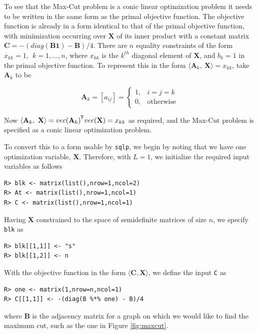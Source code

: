 \documentclass{article}
\newcommand{\ve}[1]{\mathbf{#1}}           %
\newcommand{\m}[1]{\mathbf{#1}}               %
\newcommand{\tr}[1]{{#1}^{\mkern-1.5mu\mathsf{T}}}              %
\begin{document}
To see that the Max-Cut problem is a conic linear optimization problem it needs to be written in the same form as the primal objective function. The objective function is already in a form identical to that of the primal objective function, with minimization occurring over $\m{X}$ of its inner product with a constant matrix $\m{C} = -(diag(\m{B}\ve{1}) - \m{B})/4$. There are $n$ equality constraints of the form $x_{kk} = 1,~~k=1,...,n$, where $x_{kk}$ is the $k^{th}$ diagonal element of $\m{X}$, and $b_{k} = 1$ in the primal objective function. To represent this in the form $\langle \m{A}_{k},~\m{X} \rangle = x_{kk}$,  take $\m{A}_{k}$ to be

\[
\m{A}_{k} = [a_{ij}] = 
\begin{cases}
1, & i = j = k \\
0, & \text{otherwise}
\end{cases}
\]

Now $\langle \m{A}_{k},~\m{X} \rangle = \tr{vec(\m{A}_{k})}vec(\m{X}) = x_{kk}$ as required, and the Max-Cut problem is specified as a conic linear optimization problem.

To convert this to a form usable by \verb!sqlp!, we begin by noting that we have one optimization variable, $\m{X}$. Therefore, with $L=1$, we initialize the required input variables as follows

\begin{verbatim}
R> blk <- matrix(list(),nrow=1,ncol=2)
R> At <- matrix(list(),nrow=1,ncol=1)
R> C <- matrix(list(),nrow=1,ncol=1)
\end{verbatim}

Having $\m{X}$ constrained to the space of semidefinite matrices of size $n$, we specify \verb!blk! as

\begin{verbatim}
R> blk[[1,1]] <- "s"
R> blk[[1,2]] <- n
\end{verbatim}

With the objective function in the form $\langle \m{C}, \m{X} \rangle$, we define the input \verb!C! as

\begin{verbatim}
R> one <- matrix(1,nrow=n,ncol=1)
R> C[[1,1]] <- -(diag(B %*% one) - B)/4
\end{verbatim}

\noindent where $\m{B}$ is the adjacency matrix for a graph on which we would like to find the maximum cut, such as the one in Figure \ref{fig:maxcut}.
\end{document}
